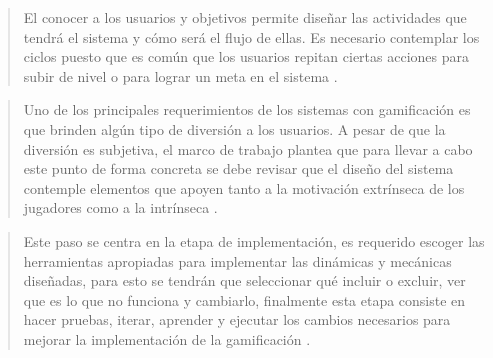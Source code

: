 
    \begin{quote}
        El conocer a los usuarios y objetivos permite diseñar las actividades que tendrá
        el sistema y cómo será el flujo de ellas. Es necesario contemplar los ciclos puesto
        que es común que los usuarios repitan ciertas acciones para subir de nivel o para
        lograr un meta en el sistema \cite[p. 66]{ForTheWin}.
    \end{quote}



    \begin{quote}
        Uno de los principales requerimientos de los sistemas con gamificación es que brinden
        algún tipo de diversión a los usuarios. A pesar de que la diversión es subjetiva, el
        marco de trabajo plantea que para llevar a cabo este punto de forma concreta se
        debe revisar que el diseño del sistema contemple elementos que apoyen tanto a la
        motivación extrínseca de los jugadores como a la intrínseca \cite[p. 68]{ForTheWin}.
    \end{quote}


    \begin{quote}
        Este paso se centra en la etapa de implementación, es requerido escoger las herramientas
        apropiadas para implementar las dinámicas y mecánicas diseñadas, para esto se tendrán
        que seleccionar qué incluir o excluir, ver que es lo que no funciona y cambiarlo,
        finalmente esta etapa consiste en hacer pruebas, iterar, aprender y ejecutar los cambios
        necesarios para mejorar la implementación de la gamificación \cite[p. 69]{ForTheWin}.
    \end{quote}
